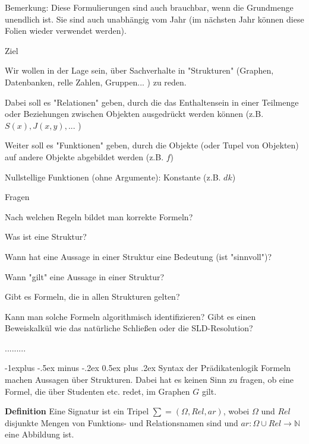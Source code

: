 \documentclass[a4paper]{article}
\makeatletter
\renewcommand{\note}[2]{\begin{noteBox} \textbf{#1} #2 \end{noteBox}}
\renewcommand{\subsection}{\@startsection{subsection}{2}{0mm}%
                {-1explus -.5ex minus -.2ex}%
                {0.5ex plus .2ex}%
                {\normalfont\normalsize\bfseries}}
\makeatother
\begin{document}
\begin{multicols}{3}
  Bemerkung: Diese Formulierungen sind auch brauchbar, wenn die Grundmenge unendlich ist. Sie sind auch unabhängig vom Jahr (im nächsten Jahr können diese Folien wieder verwendet werden).

  Ziel
  \begin{itemize*}
    \item Wir wollen in der Lage sein, über Sachverhalte in "Strukturen" (Graphen, Datenbanken, relle Zahlen, Gruppen... ) zu reden.
    \item Dabei soll es "Relationen" geben, durch die das Enthaltensein in einer Teilmenge oder Beziehungen zwischen Objekten ausgedrückt werden können (z.B. $S(x),J(x,y),...$ )
    \item Weiter soll es "Funktionen" geben, durch die Objekte (oder Tupel von Objekten) auf andere Objekte abgebildet werden (z.B. $f$)
    \item Nullstellige Funktionen (ohne Argumente): Konstante (z.B. $dk$)
  \end{itemize*}

  Fragen
  \begin{itemize*}
    \item Nach welchen Regeln bildet man korrekte Formeln?
    \item Was ist eine Struktur?
    \item Wann hat eine Aussage in einer Struktur eine Bedeutung (ist "sinnvoll")?
    \item Wann "gilt" eine Aussage in einer Struktur?
    \item Gibt es Formeln, die in allen Strukturen gelten?
    \item Kann man solche Formeln algorithmisch identifizieren? Gibt es einen Beweiskalkül wie das natürliche Schließen oder die SLD-Resolution?
    \item .........
  \end{itemize*}

  \subsection{Syntax der Prädikatenlogik}
  Formeln machen Aussagen über Strukturen. Dabei hat es keinen Sinn zu fragen, ob eine Formel, die über Studenten etc. redet, im Graphen $G$ gilt.

  \note{Definition}{Eine Signatur ist ein Tripel $\sum=(\Omega, Rel,ar)$, wobei $\Omega$ und $Rel$ disjunkte Mengen von Funktions- und Relationsnamen sind und $ar:\Omega\cup Rel\rightarrow\mathbb{N}$ eine Abbildung ist.}


\end{multicols}
\end{document}
